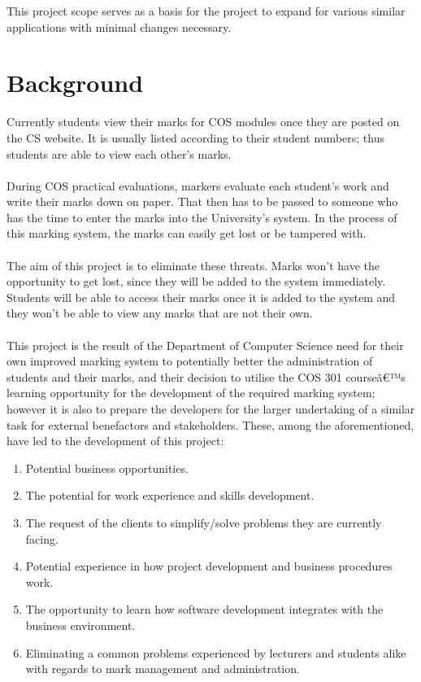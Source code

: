 \documentclass[11pt,a4paper]{article}
\begin{document}
This project scope serves as a basis for the project to expand for various similar applications with minimal changes necessary.

\section{Background}
Currently students view their marks for COS modules once they are posted
on the CS website. It is usually listed according to their student numbers;
thus students are able to view each other's marks. \\ \\
During COS practical
evaluations, markers evaluate each student's work and write their marks
down on paper. That then has to be passed to someone who has the time to
enter the marks into the University's system. In the process of this marking
system, the marks can easily get lost or be tampered with. \\ \\
The aim of this project is to eliminate these threats. Marks won't have the
opportunity to get lost, since they will be added to the system immediately.
Students will be able to access their marks once it is added to
the system and they won't be able to view any marks that are not their
own.\\ \\
This project is the result of the Department of Computer Science need for their own improved marking system to potentially better the administration of students and their marks, and their decision to utilise the COS 301 courseâ€™s learning opportunity for the development of the required marking system; however it is also to prepare the developers for the larger undertaking of a similar task for external benefactors and stakeholders. These, among the aforementioned, have led to the development of this project:
\begin{enumerate}
	\item Potential business opportunities.
	\item The potential for work experience and skills development.
	\item The request of the clients to simplify/solve problems they are currently facing.
	\item Potential experience in how project development and business procedures work.
	\item The opportunity to learn how software development integrates with the business environment.
	\item Eliminating a common problems experienced by lecturers and students alike with regards to mark management and administration.
\end{enumerate}
 
\end{document}
